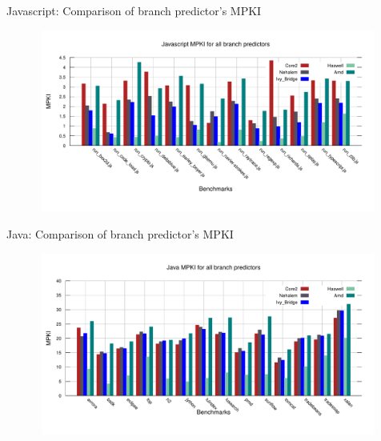 \documentclass[10pt]{beamer}
\begin{document}
\begin{frame}{Javascript: Comparison of branch predictor's MPKI}
    \begin{figure}[t]
        \centering
        \includegraphics[width=11.5cm, height=6cm]{figures/javascript_MPKI.pdf}
    \end{figure}
\end{frame}

\begin{frame}{Java: Comparison of branch predictor's MPKI}
    \begin{figure}[t]
        \centering
        \includegraphics[width=11.5cm, height=6cm]{figures/java_MPKI.pdf}
    \end{figure}
\end{frame}
\end{document}
